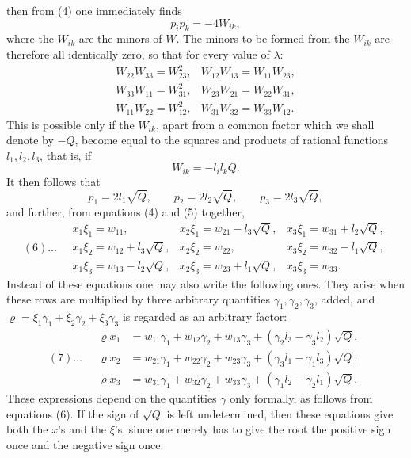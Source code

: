 \documentclass[10pt]{article}
\begin{document}
then from (4) one immediately finds
\[
p_ip_k=-4W_{ik},
\]
where the \(W_{ik}\) are the minors of \(W\). The minors to be formed from the \(W_{ik}\) are therefore all identically zero, so that for every value of \(\lambda\):
\[
\begin{array}{lll}
W_{22}W_{33}=W_{23}^{2},& W_{12}W_{13}=W_{11}W_{23},\\
W_{33}W_{11}=W_{31}^{2},& W_{23}W_{21}=W_{22}W_{31},\\
W_{11}W_{22}=W_{12}^{2},& W_{31}W_{32}=W_{33}W_{12}.
\end{array}
\]
This is possible only if the \(W_{ik}\), apart from a common factor which we shall denote by \(-Q\), become equal to the squares and products of rational functions \(l_1,l_2,l_3\), that is, if
\[
W_{ik}=-l_il_kQ.
\]
It then follows that
\[
p_1=2l_1\sqrt Q,\qquad p_2=2l_2\sqrt Q,\qquad p_3=2l_3\sqrt Q,
\]
and further, from equations (4) and (5) together,
\[
(6)\ldots\quad
\begin{array}{lll}
x_1\xi_1=w_{11},&x_2\xi_1=w_{21}-l_3\sqrt Q,&x_3\xi_1=w_{31}+l_2\sqrt Q,\\
x_1\xi_2=w_{12}+l_3\sqrt Q,&x_2\xi_2=w_{22},&x_3\xi_2=w_{32}-l_1\sqrt Q,\\
x_1\xi_3=w_{13}-l_2\sqrt Q,&x_2\xi_3=w_{23}+l_1\sqrt Q,&x_3\xi_3=w_{33}.
\end{array}
\]
Instead of these equations one may also write the following ones. They arise when these rows are multiplied by three arbitrary quantities \(\gamma_1,\gamma_2,\gamma_3\), added, and \(\varrho=\xi_1\gamma_1+\xi_2\gamma_2+\xi_3\gamma_3\) is regarded as an arbitrary factor:
\[
(7)\ldots\quad
\begin{aligned}
\varrho x_1&=w_{11}\gamma_1+w_{12}\gamma_2+w_{13}\gamma_3+(\gamma_2l_3-\gamma_3l_2)\sqrt Q,\\
\varrho x_2&=w_{21}\gamma_1+w_{22}\gamma_2+w_{23}\gamma_3+(\gamma_3l_1-\gamma_1l_3)\sqrt Q,\\
\varrho x_3&=w_{31}\gamma_1+w_{32}\gamma_2+w_{33}\gamma_3+(\gamma_1l_2-\gamma_2l_1)\sqrt Q.
\end{aligned}
\]
These expressions depend on the quantities \(\gamma\) only formally, as follows from equations (6). If the sign of \(\sqrt Q\) is left undetermined, then these equations give both the \(x\)'s and the \(\xi\)'s, since one merely has to give the root the positive sign once and the negative sign once.
\end{document}
